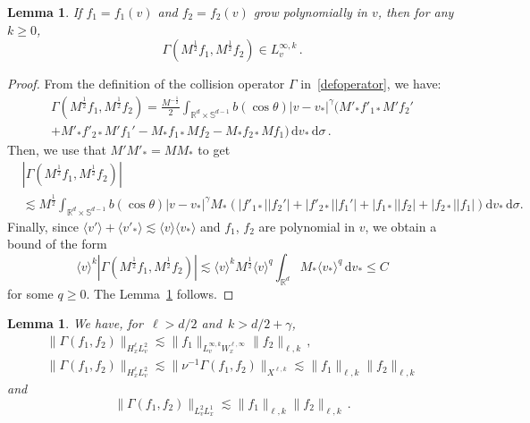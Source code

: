 \documentclass[11pt]{article}
\newtheorem{lemm}[theo]{Lemma}
\theoremstyle{definition}
\numberwithin{equation}{section}
\numberwithin{figure}{section}
\numberwithin{table}{section}
\newcommand*{\dd}{\mathrm{d}}
\newcommand*{\dv}{\dd v}
\newcommand*{\dsigma}{\dd \sigma}
\newcommand*\R {\mathbb{R}}
\newcommand*\Sp {\mathbb{S}}
\begin{document}
\begin{lemm}\label{lem:GammaLinftyv}
If $f_1=f_1(v)$ and $f_2=f_2(v)$ grow polynomially in $v$, then for any $k \ge 0$,
\[
\Gamma(M^\frac12 f_1,M^\frac12 f_2) \in L^{\infty,k}_v \,.
\]
\end{lemm}
\begin{proof}
From the definition of the collision operator $\Gamma$ in~\eqref{defoperator}, we have:
\begin{multline*}
\Gamma\left(M^\frac12 f_1,M^\frac12 f_2\right) = \frac{M^{-\frac12}}2 \int_{\R^d \times \Sp^{d-1}} b(\cos \theta) |v-v_*|^\gamma \big(M'_*f'_{1*} M' f_2'\\
+ M'_*f'_{2*} M' f_1' - M_*f_{1*} M f_2 - M_*f_{2*} M f_1 \big) \, \dv_* \, \dsigma \,.
\end{multline*}
Then, we use that $M'M'_*=MM_*$ to get
\begin{align*}
&\left|\Gamma\left(M^\frac12 f_1,M^\frac12 f_2\right)\right| \\
&\lesssim M^\frac12 \int_{\R^d \times \Sp^{d-1}} b(\cos \theta) |v-v_*|^\gamma M_* \left(|f'_{1*}| |f_2'| + |f'_{2*}| |f_1'| + |f_{1*}| |f_2| + |f_{2*}| |f_1| \right) \! \dv_* \, \dsigma \!.
\end{align*}
Finally, since $
\langle v' \rangle + \langle v'_* \rangle \lesssim \langle v \rangle \langle v_* \rangle $ and $f_1$, $f_2$ are polynomial in $v$, we obtain a bound of the form
\[
\langle v \rangle^k \left|\Gamma\left(M^\frac12 f_1,M^\frac12 f_2\right)\right|\lesssim \langle v \rangle^kM^\frac12 \langle v \rangle^q \int_{\R^d} M_* \langle v_* \rangle^q \, \dv_* \le C
\]
for some $q \ge 0$. The Lemma~\ref{lem:B4} follows.
\end{proof}

\begin{lemm}\label{lem:B4}
We have, for~$\ell>d/2$ and~$k>d/2+\gamma$,
\begin{gather}\label{eq:GammaHellxL2v}
\|\Gamma(f_1,f_2)\|_{H^\ell_xL^2_v} \lesssim \|f_1\|_{L^{\infty,k}_v W^{\ell,\infty}_x} \|f_2\|_{\ell,k}\,,
\\ \label{estimUkai1}
\|\Gamma(f_1,f_2)\|_{H^\ell_xL^2_v} \lesssim \| \nu^{-1} \Gamma(f_1,f_2)\|_{X^{\ell,k}}\lesssim \|f_1\|_{\ell,k} \|f_2\|_{\ell,k}
\end{gather}
and
\begin{equation}\label{estimUkai2}
\|\Gamma(f_1,f_2)\|_{L^2_vL^1_x} \lesssim \|f_1\|_{\ell,k} \|f_2\|_{\ell,k} \,.
\end{equation}
\end{lemm}
\end{document}
